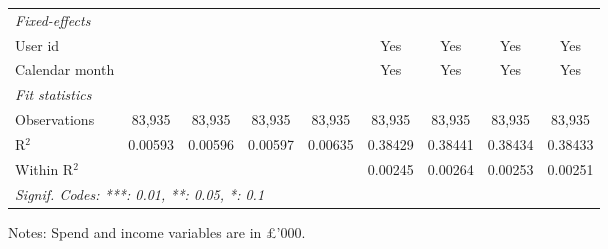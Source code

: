 \begin{table}[htbp]
\begin{threeparttable}[b]
\begin{tabular}{lcccccccc}
         \midrule
         \emph{Fixed-effects}\\
         User id                &                    &                    &                    &                    & Yes                 & Yes                 & Yes                 & Yes\\  
         Calendar month         &                    &                    &                    &                    & Yes                 & Yes                 & Yes                 & Yes\\  
         \midrule
         \emph{Fit statistics}\\
         Observations           & 83,935             & 83,935             & 83,935             & 83,935             & 83,935              & 83,935              & 83,935              & 83,935\\  
         R$^2$                  & 0.00593            & 0.00596            & 0.00597            & 0.00635            & 0.38429             & 0.38441             & 0.38434             & 0.38433\\  
         Within R$^2$           &                    &                    &                    &                    & 0.00245             & 0.00264             & 0.00253             & 0.00251\\  
         \midrule \midrule
         \multicolumn{9}{l}{\emph{Signif. Codes: ***: 0.01, **: 0.05, *: 0.1}}\\
      \end{tabular}
      
      \begin{tablenotes}\footnotesize
         \item Notes: Spend and income variables are in \pounds'000.
      \end{tablenotes}
   \end{threeparttable}
\end{table}


